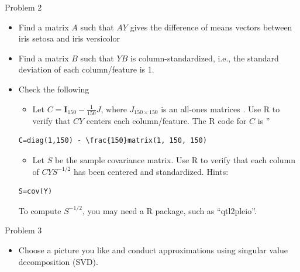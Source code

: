 \documentclass[
  ignorenonframetext,
]{beamer}
\providecommand{\tightlist}{%
  \setlength{\itemsep}{0pt}\setlength{\parskip}{0pt}}
\begin{document}
\begin{frame}[fragile]{Problem 2}
\protect\hypertarget{problem-2}{}
\begin{itemize}
\tightlist
\item
  Find a matrix \(A\) such that \(AY\) gives the difference of means
  vectors between iris setosa and iris versicolor
\item
  Find a matrix \(B\) such that \(YB\) is column-standardized, i.e., the
  standard deviation of each column/feature is 1.
\item
  Check the following

  \begin{itemize}
  \tightlist
  \item
    Let \(C=\mathbf I_{150} - \frac{1}{150}J\), where
    \(J_{150\times 150}\) is an all-ones matrices . Use R to verify that
    \(CY\) centers each column/feature. The R code for \(C\) is ''
  \end{itemize}

\begin{verbatim}
C=diag(1,150) - \frac{150}matrix(1, 150, 150)
\end{verbatim}

  \begin{itemize}
  \tightlist
  \item
    Let \(S\) be the sample covariance matrix. Use R to verify that each
    column of \(CYS^{-1/2}\) has been centered and standardized. Hints:
  \end{itemize}

\begin{verbatim}
S=cov(Y)
\end{verbatim}

  To compute \(S^{-1/2}\), you may need a R package, such as
  ``qtl2pleio''.
\end{itemize}
\end{frame}

\begin{frame}{Problem 3}
\protect\hypertarget{problem-3}{}
\begin{itemize}
\tightlist
\item
  Choose a picture you like and conduct approximations using singular
  value decomposition (SVD).
\end{itemize}
\end{frame}
\end{document}
